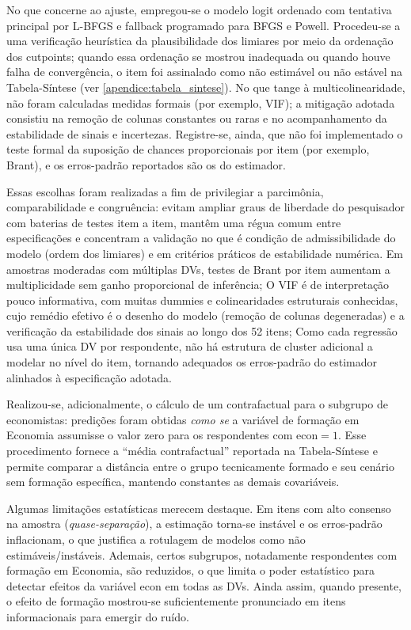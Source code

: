 No que concerne ao ajuste, empregou-se o modelo logit ordenado com tentativa principal por L-BFGS e fallback programado para BFGS e Powell. Procedeu-se a uma verificação heurística da plausibilidade dos limiares por meio da ordenação dos cutpoints; quando essa ordenação se mostrou inadequada ou quando houve falha de convergência, o item foi assinalado como não estimável ou não estável na Tabela-Síntese (ver \autoref{apendice:tabela_sintese}). No que tange à multicolinearidade, não foram calculadas medidas formais (por exemplo, VIF); a mitigação adotada consistiu na remoção de colunas constantes ou raras e no acompanhamento da estabilidade de sinais e incertezas. Registre-se, ainda, que não foi implementado o teste formal da suposição de chances proporcionais por item (por exemplo, Brant), e os erros-padrão reportados são os do estimador. 

Essas escolhas foram realizadas a fim de privilegiar a parcimônia, comparabilidade e congruência: evitam ampliar graus de liberdade do pesquisador com baterias de testes item a item, mantêm uma régua comum entre especificações e concentram a validação no que é condição de admissibilidade do modelo (ordem dos limiares) e em critérios práticos de estabilidade numérica. Em amostras moderadas com múltiplas DVs, testes de Brant por item aumentam a multiplicidade sem ganho proporcional de inferência; O VIF é de interpretação pouco informativa, com muitas dummies e colinearidades estruturais conhecidas, cujo remédio efetivo é o desenho do modelo (remoção de colunas degeneradas) e a verificação da estabilidade dos sinais ao longo dos 52 itens; Como cada regressão usa uma única DV por respondente, não há estrutura de cluster adicional a modelar no nível do item, tornando adequados os erros-padrão do estimador alinhados à especificação adotada.

Realizou-se, adicionalmente, o cálculo de um contrafactual para o subgrupo de economistas: predições foram obtidas \textit{como se} a variável de formação em Economia assumisse o valor zero para os respondentes com \(\mathrm{econ}=1\). Esse procedimento fornece a ``média contrafactual'' reportada na Tabela-Síntese e permite comparar a distância entre o grupo tecnicamente formado e seu cenário sem formação específica, mantendo constantes as demais covariáveis.

Algumas limitações estatísticas merecem destaque. Em itens com alto consenso na amostra (\textit{quase-separação}), a estimação torna-se instável e os erros-padrão inflacionam, o que justifica a rotulagem de modelos como não estimáveis/instáveis. Ademais, certos subgrupos, notadamente respondentes com formação em Economia, são reduzidos, o que limita o poder estatístico para detectar efeitos da variável \(\mathrm{econ}\) em todas as DVs. Ainda assim, quando presente, o efeito de formação mostrou-se suficientemente pronunciado em itens informacionais para emergir do ruído.

